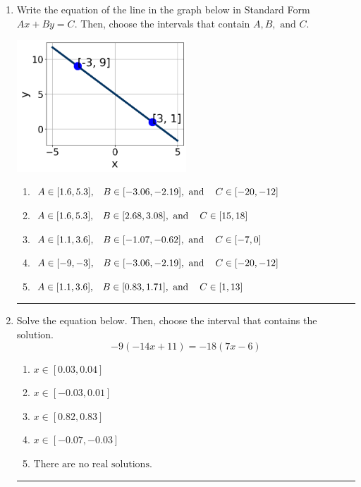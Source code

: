 \documentclass[14pt]{extbook}
\newcommand{\litem}[1]{\item#1\hspace*{-1cm}\rule{\textwidth}{0.4pt}}
\begin{document}
\begin{enumerate}
{\begin{enumerate}[label=\Alph*.]
\end{enumerate} }
\litem{
Write the equation of the line in the graph below in Standard Form $Ax+By=C$. Then, choose the intervals that contain $A, B, \text{ and } C$.
\begin{center}
    \includegraphics[width=0.5\textwidth]{../Figures/linearGraphToStandardB.png}
\end{center}
\begin{enumerate}[label=\Alph*.]
\item \( A \in [1.6, 5.3], \hspace{3mm} B \in [-3.06, -2.19], \text{ and } \hspace{3mm} C \in [-20, -12] \)
\item \( A \in [1.6, 5.3], \hspace{3mm} B \in [2.68, 3.08], \text{ and } \hspace{3mm} C \in [15, 18] \)
\item \( A \in [1.1, 3.6], \hspace{3mm} B \in [-1.07, -0.62], \text{ and } \hspace{3mm} C \in [-7, 0] \)
\item \( A \in [-9, -3], \hspace{3mm} B \in [-3.06, -2.19], \text{ and } \hspace{3mm} C \in [-20, -12] \)
\item \( A \in [1.1, 3.6], \hspace{3mm} B \in [0.83, 1.71], \text{ and } \hspace{3mm} C \in [1, 13] \)

\end{enumerate} }
\litem{
Solve the equation below. Then, choose the interval that contains the solution.\[ -9(-14x + 11) = -18(7x -6) \]\begin{enumerate}[label=\Alph*.]
\item \( x \in [0.03, 0.04] \)
\item \( x \in [-0.03, 0.01] \)
\item \( x \in [0.82, 0.83] \)
\item \( x \in [-0.07, -0.03] \)
\item \( \text{There are no real solutions.} \)


\end{enumerate}}
\end{enumerate}
\end{document}

